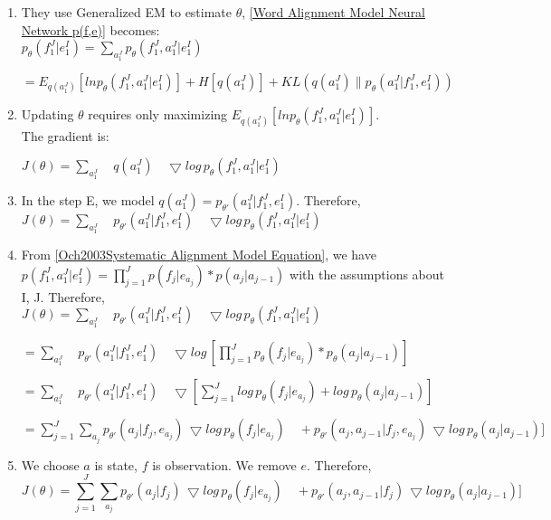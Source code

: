 \documentclass{article}
\begin{document}
\begin{enumerate}
\item They use Generalized EM to estimate $\theta$, \eqref{Word Alignment Model Neural Network p(f,e)} becomes:\\

$p_{\theta}(f_1^J|e_1^I) = \sum_{a_1^J} p_{\theta}(f_1^J, a_1^J|e_1^I)$

$ = E_{q(a_1^J)} [ln p_{\theta}(f_1^J, a_1^J|e_1^I) ] + H[q(a_1^J)] + KL(q(a_1^J) \| p_{\theta}(a_1^J|f_1^J,e_1^I) ) $

\item Updating $\theta$ requires only maximizing $E_{q(a_1^J)} [ln p_{\theta}(f_1^J, a_1^J|e_1^I) ]$. \\ The gradient is: \\

$ J(\theta) = \sum_{a_1^J} \quad q(a_1^J)\quad \bigtriangledown log \, p_{\theta}(f_1^J, a_1^J|e_1^I)  $

\item In the step E, we model $q(a_1^J) = p_{\theta'}(a_1^J|f_1^J,e_1^I)$.
Therefore,\\

$ J(\theta) = \sum_{a_1^J} \quad p_{\theta'}(a_1^J|f_1^J,e_1^I) \quad \bigtriangledown log \, p_{\theta}(f_1^J, a_1^J|e_1^I)  $

\item From \eqref{Och2003Systematic Alignment Model Equation}, we have \\
$p(f_1^J, a_1^J|e_1^I) = \prod_{j=1}^J p(f_j | e_{a_j}) * p(a_j | a_{j-1})$  with the assumptions about I, J.
Therefore, \\

$ J(\theta) = \sum_{a_1^J} \quad p_{\theta'}(a_1^J|f_1^J,e_1^I) \quad \bigtriangledown log \, p_{\theta}(f_1^J, a_1^J|e_1^I)  $

$ = \sum_{a_1^J} \quad p_{\theta'}(a_1^J|f_1^J,e_1^I) \quad \bigtriangledown log \, [\prod_{j=1}^J p_{\theta}(f_j | e_{a_j}) * p_{\theta}(a_j | a_{j-1})  ] $

$ = \sum_{a_1^J} \quad p_{\theta'}(a_1^J|f_1^J,e_1^I) \quad \bigtriangledown [\sum_{j=1}^J log \, p_{\theta}(f_j | e_{a_j}) + log \, p_{\theta}(a_j | a_{j-1})  ] $

$ = \sum_{j=1}^J \sum_{a_j} p_{\theta'}(a_j|f_j,e_{a_j}) \, \bigtriangledown log \, p_{\theta}(f_j | e_{a_j}) \quad + p_{\theta'}(a_j, a_{j-1}|f_j,e_{a_j}) \, \bigtriangledown log \, p_{\theta}(a_j | a_{j-1})  ] $

\item We choose $a$ is state, $f$ is observation. We remove $e$.
Therefore, \\

\begin{equation}
J(\theta) = \sum_{j=1}^J \sum_{a_j} p_{\theta'}(a_j|f_j) \, \bigtriangledown log \, p_{\theta}(f_j | e_{a_j}) \quad + p_{\theta'}(a_j, a_{j-1}|f_j) \, \bigtriangledown log \, p_{\theta}(a_j | a_{j-1})  ] 
\label{Word Alignment Model Neural Network Gradient}
\end{equation}

\end{enumerate}
\end{document}
